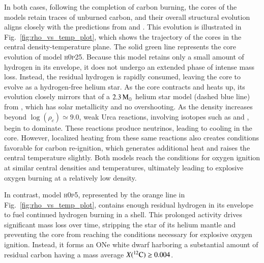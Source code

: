 \documentclass[main.tex]{subfiles}
\begin{document}
    In both cases, following the completion of carbon burning, the cores of the models retain traces of unburned carbon, and their overall structural evolution aligns closely with the predictions from \cite{AC20} and \cite{CA22}. This evolution is illustrated in Fig.~\ref{fig:rho_vs_temp_plot}, which shows the trajectory of the cores in the central density-temperature plane. The solid green line represents the core evolution of model \textsc{h0p25}. Because this model retains only a small amount of hydrogen in its envelope, it does not undergo an extended phase of intense mass loss. Instead, the residual hydrogen is rapidly consumed, leaving the core to evolve as a hydrogen-free helium star. As the core contracts and heats up, its evolution closely mirrors that of a $2.3\msun$ helium star model (dashed blue line) from \cite{CA22}, which has solar metallicity and no overshooting. 
    As the density increases beyond $\log(\rho_c) \simeq 9.0$, weak Urca reactions, involving isotopes such as  and , begin to dominate. These reactions produce neutrinos, leading to cooling in the core. However, localized heating from these same reactions also creates conditions favorable for carbon re-ignition, which generates additional heat and raises the central temperature slightly. Both models reach the conditions for oxygen ignition at similar central densities and temperatures, ultimately leading to explosive oxygen burning at a relatively low density.
    
    In contrast, model \textsc{h0p5}, represented by the orange line in Fig.~\ref{fig:rho_vs_temp_plot}, contains enough residual hydrogen in its envelope to fuel continued hydrogen burning in a shell. This prolonged activity drives significant mass loss over time, stripping the star of its helium mantle and preventing the core from reaching the conditions necessary for explosive oxygen ignition. Instead, it forms an ONe white dwarf harboring a substantial amount of residual carbon having a mass average $X(\iso{C}{12}) \geq 0.004$. 
\end{document}
